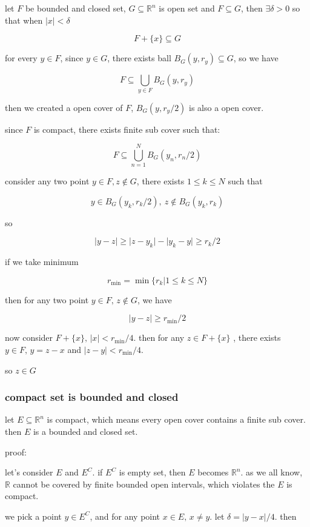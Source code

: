 \documentclass[11pt,a4paper]{article}
\begin{document}
let $F$ be bounded and closed set, $G \subseteq \mathbb{R}^n$ is open set and $F \subseteq G$, then
$\exists \delta >0$ so that when $\lvert x \rvert < \delta$

\[
F + \{ x \} \subseteq G
\]

for every $y \in F$, since $y \in G$, there exists ball $B_{G}(y, r_y) \subseteq G$, so we have

\[
F \subseteq \bigcup_{y \in F}B_{G}(y, r_y)
\]

then we created a open cover of $F$, $B_{G}(y, r_y/2)$ is also a open cover.

since $F$ is compact, there exists finite sub cover such that:

\[
F \subseteq \bigcup_{n=1}^{N}B_G(y_n, r_n/2)
\]

consider any two point $y \in F, z \notin G$, there exists $1 \le k \le N$ such that

\[
y \in B_G(y_k, r_k/2),\: z \notin B_G(y_k, r_k)
\]

so 

\[
\lvert y - z \rvert \ge  \lvert z - y_k\rvert - \lvert y_k - y \rvert \ge r_k / 2
\]

if we take minimum 

\[
r_{\min} = \min \{ r_k \vert 1 \le k \le N \}
\]

then for any two point $y \in F,\, z \notin G$, we have

\[
\lvert y - z \rvert \ge r_{\min} / 2
\]

now consider $F + \{ x \},\, \lvert x \rvert < r_{\min} / 4$. then for any 
$z \in F + \{ x \}$ , there exists $y \in F,\, y = z - x$ and $\lvert z - y\rvert < r_{\min} / 4$.

so $z \in G$

\subsubsection{compact set is bounded and closed}

let $E \subseteq \mathbb{R}^n$ is compact, which means every open cover contains a finite sub cover.
then $E$ is a bounded and closed set.

proof:

let's consider $E$ and $E^C$. if  $E^C$ is empty set, then  $E$ becomes $\mathbb{R}^n$.
as we all know, $\mathbb{R}$ cannot be covered by finite bounded open intervals, which violates the $E$ is compact.

we pick a point $y \in E^C$, and for any point $x \in E,\, x \ne y$. let $\delta = |y-x| /4 $. then 
\end{document}
